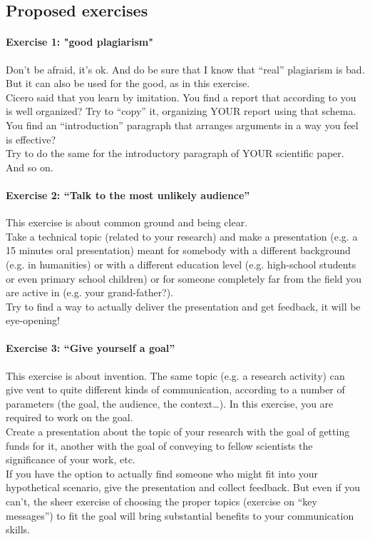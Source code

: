 \documentclass{article}
\begin{document}
\subsection{Proposed exercises}
\paragraph{Exercise 1: "good plagiarism"}
Don’t be afraid, it’s ok. And do be sure that I know that “real” plagiarism is bad. But it can also be used for the good, as in this exercise.\\
Cicero said that you learn by imitation. You find a report that according to you is well organized? Try to “copy” it, organizing YOUR report using that schema. You find an “introduction” paragraph that arranges arguments in a way you feel is effective?\\
Try to do the same for the introductory paragraph of YOUR scientific paper. And so on.\\
\paragraph{Exercise 2: “Talk to the most unlikely audience”}
This exercise is about common ground and being clear.\\
Take a technical topic (related to your research) and make a presentation (e.g. a 15 minutes oral presentation) meant for somebody with a different background (e.g. in humanities) or with a different education level (e.g. high-school students or even primary school children) or for someone completely far from the field you are active in (e.g. your grand-father?).\\
Try to find a way to actually deliver the presentation and get feedback, it will be eye-opening!\\
\paragraph{Exercise 3: “Give yourself a goal”}
This exercise is about invention. The same topic (e.g. a research activity) can give vent to quite different kinds of communication, according to a number of parameters (the goal, the audience, the context…). In this exercise, you are required to work on the goal.\\
Create a presentation about the topic of your research with the goal of getting funds for it, another with the goal of conveying to fellow scientists the significance of your work, etc.\\
If you have the option to actually find someone who might fit into your hypothetical scenario, give the presentation and collect feedback. But even if you can’t, the sheer exercise of choosing the proper topics (exercise on “key messages”) to fit the goal will bring substantial benefits to your communication skills.
\end{document}
